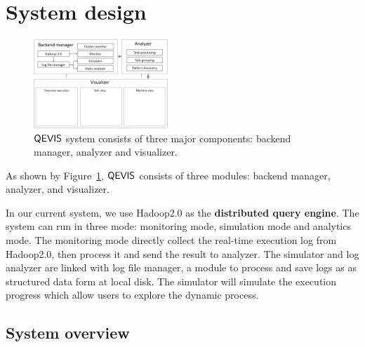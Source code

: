 \section{System design}
\begin{figure}[t]
	\centering
	\includegraphics[width=0.45\textwidth]{figures/system/sysdesign.png}
	\vspace{-3mm}
	\caption{$\mathsf{QEVIS}$ system consists of three major components: backend manager, analyzer and visualizer.}
	\label{fig:sysdesign}
	\vspace{-3mm}
\end{figure}
As shown by Figure~\ref{fig:sysdesign}, $\mathsf{QEVIS}$ consists of three modules: backend manager, analyzer, and visualizer. 

In our current system, we use Hadoop2.0 as the\textbf{ distributed query engine}. The system can run in three mode: monitoring mode, simulation mode and analytics mode. The monitoring mode directly collect the real-time execution log from Hadoop2.0, then process it and send the result to analyzer. The simulator and log analyzer are linked with log file manager, a module to process and save logs as as structured data form at local disk. The simulator will simulate the execution progress which allow users to explore the dynamic process.

\subsection{System overview}
